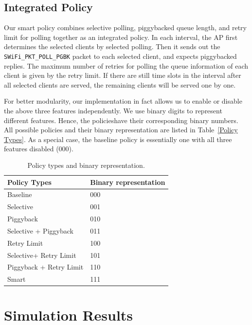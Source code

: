 \documentclass{article}
\begin{document}
\subsection{Integrated Policy}
Our smart policy combines selective polling, piggybacked queue length, and retry limit for polling together as an integrated policy. In each interval, the AP first determines the selected clients by selected polling. Then it sends out the \lstinline|SWiFi_PKT_POLL_PGBK| packet to each selected client, and expects piggybacked replies. The maximum number of retries for polling the queue information of each client is given by the retry limit. If there are still time slots in the interval after all selected clients are served, the remaining clients will be served one by one.

For better modularity, our implementation in fact allows us to enable or disable the above three features independently. We use binary digits to represent different features. Hence, the policieshave their corresponding binary numbers. All possible policies and their binary representation are listed in Table~\ref{Policy Types}. As a special case, the baseline policy is essentially one with all three features disabled (000).

\begin{table}[htbp]
   \centering
   \caption{Policy types and binary representation.}
   \label{Policy Types}
   \begin{tabular}{| P{4cm} | P{3.5cm} |}
       \hline
       Policy Types   &  Binary representation\\   \hline
       Baseline &  000\\ \hline
       Selective & 001\\ \hline
       Piggyback & 010\\ \hline
       Selective + Piggyback & 011\\ \hline
       Retry Limit  &100\\ \hline
       Selective+ Retry Limit & 101\\ \hline
       Piggyback + Retry Limit & 110\\ \hline
       Smart &  111\\
       \hline
   \end{tabular}
\label{table: policy}
\end{table} 

\section{Simulation Results}
\end{document}
